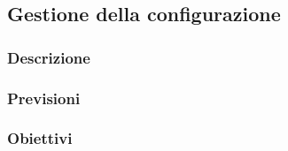 \subsection{Gestione della configurazione}
\subsubsection{Descrizione}

\subsubsection{Previsioni}

\subsubsection{Obiettivi} 

